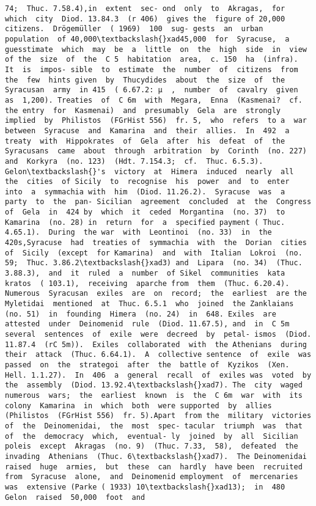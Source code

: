 \documentclass[11pt]{article}
\begin{document}
\begin{Verbatim}[commandchars=\\\{\}]
74;  Thuc. 7.58.4),in  extent  sec- ond  only  to  Akragas,  for  which  city  Diod. 13.84.3  (r 406)  gives the  figure of 20,000  citizens.  Drögemüller  ( 1969)  100  sug- gests  an  urban  population  of 40,000\textbackslash{}xad45,000  for  Syracuse,  a guesstimate  which  may  be  a  little  on  the  high  side  in  view  of the  size  of  the  C 5  habitation  area,  c. 150  ha  (infra).  It  is  impos- sible  to  estimate  the  number  of  citizens  from  the  few  hints given  by  Thucydides  about  the  size  of  the  Syracusan  army  in 415  ( 6.67.2: µ  ,  number  of  cavalry  given  as  1,200). Treaties  of  C 6m  with  Megara,  Enna  (Kasmenai?  cf.  the entry  for  Kasmenai)  and  presumably  Gela  are  strongly implied  by  Philistos  (FGrHist 556)  fr. 5,  who  refers  to a  war between  Syracuse  and  Kamarina  and  their  allies.  In  492  a treaty  with  Hippokrates  of  Gela  after  his  defeat  of  the Syracusans  came  about  through  arbitration  by  Corinth  (no. 227)  and  Korkyra  (no. 123)  (Hdt. 7.154.3;  cf.  Thuc. 6.5.3). Gelon\textbackslash{}'s  victory  at  Himera  induced  nearly  all  the  cities  of Sicily  to  recognise  his  power  and  to  enter  into  a  symmachia with  him  (Diod. 11.26.2).  Syracuse  was  a  party  to  the  pan- Sicilian  agreement  concluded  at  the  Congress  of  Gela  in  424 by  which  it  ceded  Morgantina  (no. 37)  to  Kamarina  (no. 28) in  return  for  a  specified payment ( Thuc. 4.65.1).  During  the war  with  Leontinoi  (no. 33)  in  the  420s,Syracuse  had  treaties of  symmachia  with  the  Dorian  cities  of  Sicily  (except  for Kamarina)  and  with  Italian  Lokroi  (no. 59;  Thuc. 3.86.2\textbackslash{}xad3) and  Lipara  (no. 34)  (Thuc. 3.88.3),  and  it  ruled  a  number  of Sikel  communities  kata  kratos  ( 103.1),  receiving  aparche from  them  (Thuc. 6.20.4). Numerous  Syracusan  exiles  are  on  record;  the  earliest  are the  Myletidai  mentioned  at  Thuc. 6.5.1  who  joined  the Zanklaians  (no. 51)  in  founding  Himera  (no. 24)  in  648. Exiles  are  attested  under  Deinomenid  rule  (Diod. 11.67.5), and  in  C 5m  several  sentences  of  exile  were  decreed  by  petal- ismos  (Diod. 11.87.4  (rC 5m)).  Exiles  collaborated  with  the Athenians  during  their  attack  (Thuc. 6.64.1).  A  collective sentence  of  exile  was  passed  on  the  strategoi  after  the  battle of  Kyzikos  (Xen.  Hell. 1.1.27).  In  406  a  general  recall  of  exiles was  voted  by  the  assembly  (Diod. 13.92.4\textbackslash{}xad7). The  city  waged  numerous  wars;  the  earliest  known  is  the  C 6m  war  with  its  colony  Kamarina  in  which  both  were supported  by  allies  (Philistos  (FGrHist 556)  fr. 5).Apart  from the  military  victories  of  the  Deinomenidai,  the  most  spec- tacular  triumph  was  that  of  the  democracy  which,  eventual- ly  joined  by  all  Sicilian  poleis  except  Akragas  (no. 9)  (Thuc. 7.33,  58),  defeated  the  invading  Athenians  (Thuc. 6\textbackslash{}xad7).  The Deinomenidai  raised  huge  armies,  but  these  can  hardly  have been  recruited  from  Syracuse  alone,  and  Deinomenid employment  of  mercenaries  was  extensive (Parke ( 1933) 10\textbackslash{}xad13);  in  480  Gelon  raised  50,000  foot  and  
\end{Verbatim}
\end{document}
